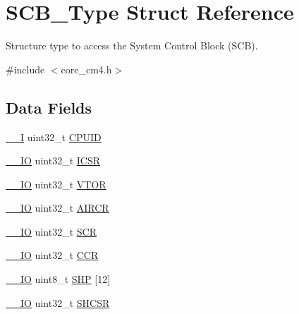 \hypertarget{struct_s_c_b___type}{}\section{S\+C\+B\+\_\+\+Type Struct Reference}
\label{struct_s_c_b___type}


Structure type to access the System Control Block (S\+CB).  




{\ttfamily \#include $<$core\+\_\+cm4.\+h$>$}

\subsection*{Data Fields}
\begin{DoxyCompactItemize}
\item 
\hyperlink{group___c_m_s_i_s__core__definitions_gaf63697ed9952cc71e1225efe205f6cd3}{\+\_\+\+\_\+I} uint32\+\_\+t \hyperlink{struct_s_c_b___type_a30abfea43143a424074f682bd61eace0}{C\+P\+U\+ID}
\item 
\hyperlink{group___c_m_s_i_s__core__definitions_gaec43007d9998a0a0e01faede4133d6be}{\+\_\+\+\_\+\+IO} uint32\+\_\+t \hyperlink{struct_s_c_b___type_a8fec9e122b923822e7f951cd48cf1d47}{I\+C\+SR}
\item 
\hyperlink{group___c_m_s_i_s__core__definitions_gaec43007d9998a0a0e01faede4133d6be}{\+\_\+\+\_\+\+IO} uint32\+\_\+t \hyperlink{struct_s_c_b___type_aaf388a921a016cae590cfcf1e43b1cdf}{V\+T\+OR}
\item 
\hyperlink{group___c_m_s_i_s__core__definitions_gaec43007d9998a0a0e01faede4133d6be}{\+\_\+\+\_\+\+IO} uint32\+\_\+t \hyperlink{struct_s_c_b___type_aaec159b48828355cb770049b8b2e8d91}{A\+I\+R\+CR}
\item 
\hyperlink{group___c_m_s_i_s__core__definitions_gaec43007d9998a0a0e01faede4133d6be}{\+\_\+\+\_\+\+IO} uint32\+\_\+t \hyperlink{struct_s_c_b___type_a64a95891ad3e904dd5548112539c1c98}{S\+CR}
\item 
\hyperlink{group___c_m_s_i_s__core__definitions_gaec43007d9998a0a0e01faede4133d6be}{\+\_\+\+\_\+\+IO} uint32\+\_\+t \hyperlink{struct_s_c_b___type_a5e1322e27c40bf91d172f9673f205c97}{C\+CR}
\item 
\hyperlink{group___c_m_s_i_s__core__definitions_gaec43007d9998a0a0e01faede4133d6be}{\+\_\+\+\_\+\+IO} uint8\+\_\+t \hyperlink{struct_s_c_b___type_a17dc9f83c53cbf7fa249e79a2d2a43f8}{S\+HP} \mbox{[}12\mbox{]}
\item 
\hyperlink{group___c_m_s_i_s__core__definitions_gaec43007d9998a0a0e01faede4133d6be}{\+\_\+\+\_\+\+IO} uint32\+\_\+t \hyperlink{struct_s_c_b___type_a04d136e5436e5fa2fb2aaa78a5f86b19}{S\+H\+C\+SR}

\end{DoxyCompactItemize}

